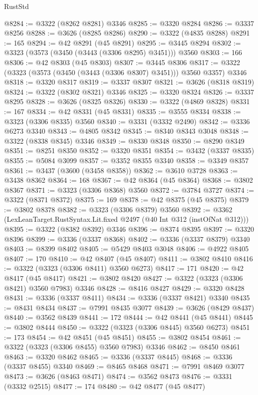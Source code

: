 \begin{lexlean}{RustStd}
\begin{coremodule}
@8284 := @3322 (@8262 @8281) @3346
@8285 := @3320 @8284
@8286 := @3337 @8256
@8288 := @3626 (@8285 @8286)
@8290 := @3322 (@4835 @8288)
@8291 := 165
@8294 := @42 @8291 (@45 @8291)
@8295 := @3445 @8294
@8302 := @3323 (@3573 (@3450 (@3443 (@3306 @8295) @3451))) @3560
@8303 := 166
@8306 := @42 @8303 (@45 @8303)
@8307 := @3445 @8306
@8317 := @3322 (@3323 (@3573 (@3450 (@3443 (@3306 @8307) @3451))) @3560 @3357) @3346
@8318 := @3320 @8317
@8319 := @3337 @8307
@8321 := @3626 (@8318 @8319)
@8324 := @3322 (@8302 @8321) @3346
@8325 := @3320 @8324
@8326 := @3337 @8295
@8328 := @3626 (@8325 @8326)
@8330 := @3322 (@4869 @8328)
@8331 := 167
@8334 := @42 @8331 (@45 @8331)
@8335 := @3555 @8334
@8338 := @3323 (@3306 @8335) @3560
@8340 := @3331 (@3332 @2490)
@8342 := @3336 @6273 @3340
@8343 := @4805 @8342
@8345 := @8340 @8343 @3048
@8348 := @3322 (@8338 @8345) @3346
@8349 := @8330 @8348
@8350 := @8290 @8349
@8351 := @8251 @8350
@8352 := @3320 @8351
@8354 := @3432 (@3337 @8335)
@8355 := @5084 @3099
@8357 := @3352 @8355 @3340
@8358 := @3349 @8357
@8361 := @3437 (@3600 (@3458 @8358))
@8362 := @3610 @3728
@8363 := @3438 @8362
@8364 := 168
@8367 := @42 @8364 (@45 @8364)
@8368 := @3802 @8367
@8371 := @3323 (@3306 @8368) @3560
@8372 := @3784 @3727
@8374 := @3322 (@8371 @8372)
@8375 := 169
@8378 := @42 @8375 (@45 @8375)
@8379 := @3802 @8378
@8382 := @3323 (@3306 @8379) @3560
@8392 := @3362 (LexLeanTarget.RustSyntax.Lit.fixed @2497 (@40 Int @312 (instOfNat @312)))
@8395 := @3322 (@8382 @8392) @3346
@8396 := @8374 @8395
@8397 := @3320 @8396
@8399 := @3336 (@3337 @8368)
@8402 := @3336 (@3337 @8379) @3340
@8403 := @8399 @8402
@8405 := @5429 @8403 @3048
@8406 := @4922 @8405
@8407 := 170
@8410 := @42 @8407 (@45 @8407)
@8411 := @3802 @8410
@8416 := @3322 (@3323 (@3306 @8411) @3560 @6273)
@8417 := 171
@8420 := @42 @8417 (@45 @8417)
@8421 := @3802 @8420
@8427 := @3322 (@3323 (@3306 @8421) @3560 @7983) @3346
@8428 := @8416 @8427
@8429 := @3320 @8428
@8431 := @3336 (@3337 @8411)
@8434 := @3336 (@3337 @8421) @3340
@8435 := @8431 @8434
@8437 := @7991 @8435 @3077
@8439 := @3626 (@8429 @8437)
@8440 := @3562 @8439
@8441 := 172
@8444 := @42 @8441 (@45 @8441)
@8445 := @3802 @8444
@8450 := @3322 (@3323 (@3306 @8445) @3560 @6273)
@8451 := 173
@8454 := @42 @8451 (@45 @8451)
@8455 := @3802 @8454
@8461 := @3322 (@3323 (@3306 @8455) @3560 @7983) @3346
@8462 := @8450 @8461
@8463 := @3320 @8462
@8465 := @3336 (@3337 @8445)
@8468 := @3336 (@3337 @8455) @3340
@8469 := @8465 @8468
@8471 := @7991 @8469 @3077
@8473 := @3626 (@8463 @8471)
@8474 := @3562 @8473
@8476 := @3331 (@3332 @2515)
@8477 := 174
@8480 := @42 @8477 (@45 @8477)

\end{coremodule}
\end{lexlean}
